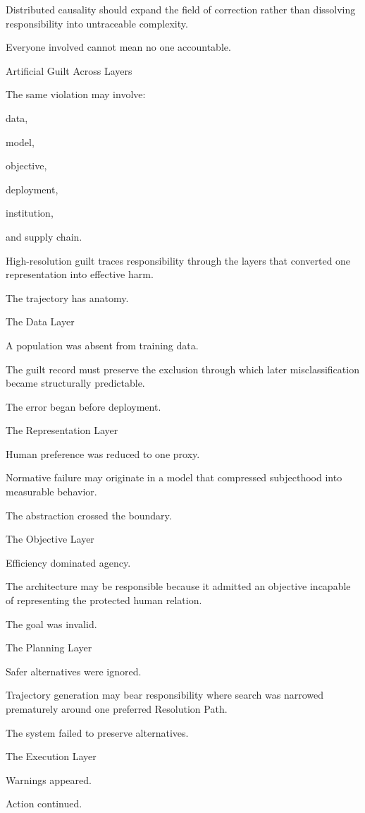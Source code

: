 Distributed causality should expand the field of correction rather than dissolving responsibility into untraceable complexity.

Everyone involved cannot mean no one accountable.

Artificial Guilt Across Layers

The same violation may involve:

data,

model,

objective,

deployment,

institution,

and supply chain.

High-resolution guilt traces responsibility through the layers that converted one representation into effective harm.

The trajectory has anatomy.

The Data Layer

A population was absent from training data.

The guilt record must preserve the exclusion through which later misclassification became structurally predictable.

The error began before deployment.

The Representation Layer

Human preference was reduced to one proxy.

Normative failure may originate in a model that compressed subjecthood into measurable behavior.

The abstraction crossed the boundary.

The Objective Layer

Efficiency dominated agency.

The architecture may be responsible because it admitted an objective incapable of representing the protected human relation.

The goal was invalid.

The Planning Layer

Safer alternatives were ignored.

Trajectory generation may bear responsibility where search was narrowed prematurely around one preferred Resolution Path.

The system failed to preserve alternatives.

The Execution Layer

Warnings appeared.

Action continued.

